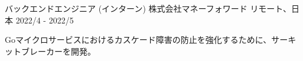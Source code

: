 \begin{cventries}
\cventry
  {バックエンドエンジニア (インターン)} %
  {株式会社マネーフォワード} %
  {リモート、日本} %
  {2022/4 - 2022/5} %
  {
    \begin{cvjobdesc} %
      Goマイクロサービスにおけるカスケード障害の防止を強化するために、サーキットブレーカーを開発。
    \end{cvjobdesc}
  }



\end{cventries}
